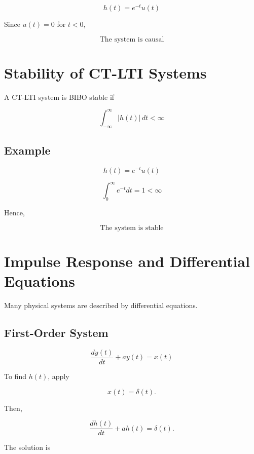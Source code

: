 \[
h(t)=e^{-t}u(t)
\]

Since \(u(t)=0\) for \(t<0\),

\[
\boxed{
\text{The system is causal}
}
\]


\section{Stability of CT-LTI Systems}

A CT-LTI system is BIBO stable if

\[
\boxed{
\int_{-\infty}^{\infty}|h(t)|\,dt<\infty
}
\]


\subsection{Example}

\[
h(t)=e^{-t}u(t)
\]

\[
\int_0^\infty e^{-t}dt=1<\infty
\]

Hence,

\[
\boxed{
\text{The system is stable}
}
\]


\section{Impulse Response and Differential Equations}

Many physical systems are described by differential equations.


\subsection{First-Order System}

\[
\boxed{
\frac{dy(t)}{dt}+ay(t)=x(t)
}
\]

To find \(h(t)\), apply

\[
x(t)=\delta(t).
\]

Then,

\[
\frac{dh(t)}{dt}+ah(t)=\delta(t).
\]

The solution is

